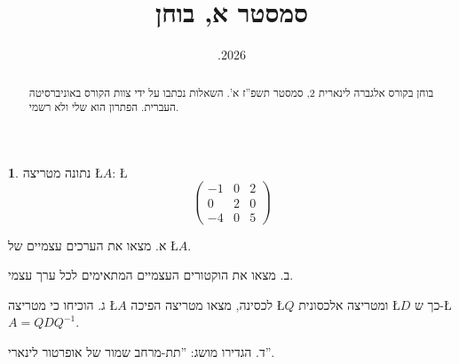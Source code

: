 \documentclass[english,hebrew]{article}
\theoremstyle{definition}
\newtheorem*{problem*}{\protect\problemname}
\theoremstyle{definition}
\providecommand{\problemname}{בעיה}
\begin{document}
\title{סמסטר {\endL}א, בוחן {\endL}}
\date{{.2026\endL}}
\maketitle
\begin{abstract}
בוחן {\endL} בקורס אלגברה לינארית 2, סמסטר תשפ”ז א’. השאלות
נכתבו על ידי צוות הקורס באוניברסיטה העברית. הפתרון הוא שלי ולא רשמי.
\end{abstract}
\begin{problem*}
נתונה מטריצה \L{$A$}: \L{%
\[
\begin{pmatrix}-1 & 0 & 2\\
0 & 2 & 0\\
-4 & 0 & 5
\end{pmatrix}
\]
}%

א. מצאו את הערכים עצמיים של \L{$A$}.

ב. מצאו את הוקטורים העצמיים המתאימים לכל ערך עצמי.

ג. הוכיחו כי מטריצה \L{$A$} לכסינה, מצאו מטריצה הפיכה \L{$Q$} ומטריצה
אלכסונית \L{$D$} כך ש-\L{$A=QDQ^{-1}$}.

ד. הגדירו מושג: \textquotedblright תת-מרחב שמור של אופרטור לינארי\textquotedblright .
\end{problem*}
\end{document}
